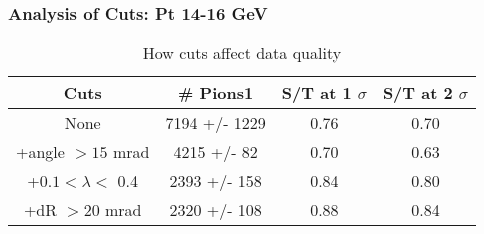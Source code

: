 \frame
{
\frametitle{Analysis of Cuts: Pt 14-16 GeV}
\begin{table}
\caption{How cuts affect data quality}
\centering
\begin{tabular}{c c c c}
\hline\hline
Cuts & \# Pions1 & S/T at 1 $\sigma$ & S/T at 2 $\sigma$ \\ [0.5ex]
\hline
None & 7194 +/- 1229 & 0.76 & 0.70 \\ %
+angle $> 15$ mrad & 4215 +/-   82 & 0.70 & 0.63 \\ %
+$0.1 < \lambda <$ 0.4 & 2393 +/-  158 & 0.84 & 0.80 \\ %
+dR $> 20$ mrad & 2320 +/-  108 & 0.88 & 0.84 \\ %
[1ex]
\hline
\end{tabular}
\label{table:nonlin}
\end{table}
}
